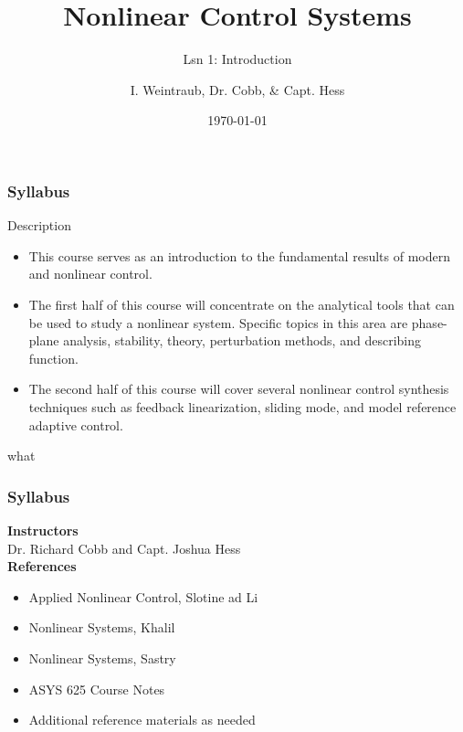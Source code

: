 \documentclass[show notes]{beamer}       %
\title[Your Short Title]{Nonlinear Control Systems}
\subtitle{Lsn 1: Introduction}
\author{I. Weintraub, Dr. Cobb, \& Capt. Hess}
\institute{Air Force Institute of Technology}
\date{\today}
\begin{document}
\begin{frame}
  \titlepage
\end{frame}
\begin{frame}
\frametitle{Syllabus}
    Description
    \begin{itemize}
      \item This course serves as an introduction to the fundamental results of modern and nonlinear control. 
      \item The first half of this course will concentrate on the analytical tools that can be used to study a nonlinear system. Specific topics in this area are phase-plane analysis, stability,  theory, perturbation methods, and describing function.
    \item The second half of this course will cover several nonlinear control synthesis techniques such as feedback linearization, sliding mode, and model reference adaptive control.
    \end{itemize}
what\end{frame}

\begin{frame}
\frametitle{Syllabus}

	\textbf{Instructors}\\
    Dr. Richard Cobb and Capt. Joshua Hess\\
	\textbf{References}\\
 	\begin{itemize}
 	\item Applied Nonlinear Control, Slotine ad Li
    \item Nonlinear Systems, Khalil
    \item Nonlinear Systems, Sastry
    \item ASYS 625 Course Notes
    \item Additional reference materials as needed
 	\end{itemize}
\end{frame}
\end{document}
